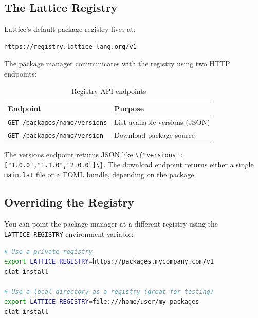 \subsection{The Lattice Registry}\label{subsec:registry}

Lattice's default package registry lives at:

\begin{lstlisting}[language=bash, numbers=none]
https://registry.lattice-lang.org/v1
\end{lstlisting}

The package manager communicates with the registry using two HTTP endpoints:

\begin{table}[h]
\centering
\caption{Registry API endpoints}\label{tab:registry-endpoints}
\begin{tabular}{@{}ll@{}}
\toprule
\textbf{Endpoint} & \textbf{Purpose} \\
\midrule
\texttt{GET /packages/\textlangle{}name\textrangle{}/versions} & List available versions (JSON) \\
\texttt{GET /packages/\textlangle{}name\textrangle{}/\textlangle{}version\textrangle{}} & Download package source \\
\bottomrule
\end{tabular}
\end{table}

The versions endpoint returns JSON like \lstinline|\{"versions":["1.0.0","1.1.0","2.0.0"]\}|.
The download endpoint returns either a single \texttt{main.lat} file or a TOML bundle, depending on the package.

\subsection{Overriding the Registry}\label{subsec:registry-override}

You can point the package manager at a different registry using the \texttt{LATTICE\_REGISTRY} environment variable:

\begin{lstlisting}[language=bash, numbers=none]
# Use a private registry
export LATTICE_REGISTRY=https://packages.mycompany.com/v1
clat install

# Use a local directory as a registry (great for testing)
export LATTICE_REGISTRY=file:///home/user/my-packages
clat install
\end{lstlisting}

